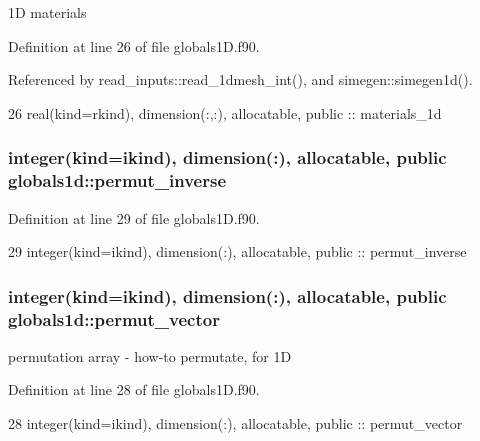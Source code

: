 1D materials 



Definition at line 26 of file globals1\+D.\+f90.



Referenced by read\+\_\+inputs\+::read\+\_\+1dmesh\+\_\+int(), and simegen\+::simegen1d().


\begin{DoxyCode}
26   \textcolor{keywordtype}{real(kind=rkind)}, \textcolor{keywordtype}{dimension(:,:)}, \textcolor{keywordtype}{allocatable}, \textcolor{keywordtype}{public} :: materials\_1d
\end{DoxyCode}
\subsubsection[{permut\+\_\+inverse}]{\setlength{\rightskip}{0pt plus 5cm}integer(kind=ikind), dimension(\+:), allocatable, public globals1d\+::permut\+\_\+inverse}\label{namespaceglobals1d_ac2022c2cd46f933f8743e7f7724c4340}


Definition at line 29 of file globals1\+D.\+f90.


\begin{DoxyCode}
29   \textcolor{keywordtype}{integer(kind=ikind)}, \textcolor{keywordtype}{dimension(:)}, \textcolor{keywordtype}{allocatable}, \textcolor{keywordtype}{public} :: permut\_inverse
\end{DoxyCode}
\subsubsection[{permut\+\_\+vector}]{\setlength{\rightskip}{0pt plus 5cm}integer(kind=ikind), dimension(\+:), allocatable, public globals1d\+::permut\+\_\+vector}\label{namespaceglobals1d_a71c30b9d6e740673ec5a9cbd36b6cb29}


permutation array -\/ how-\/to permutate, for 1D 



Definition at line 28 of file globals1\+D.\+f90.


\begin{DoxyCode}
28   \textcolor{keywordtype}{integer(kind=ikind)}, \textcolor{keywordtype}{dimension(:)}, \textcolor{keywordtype}{allocatable}, \textcolor{keywordtype}{public} :: permut\_vector
\end{DoxyCode}
